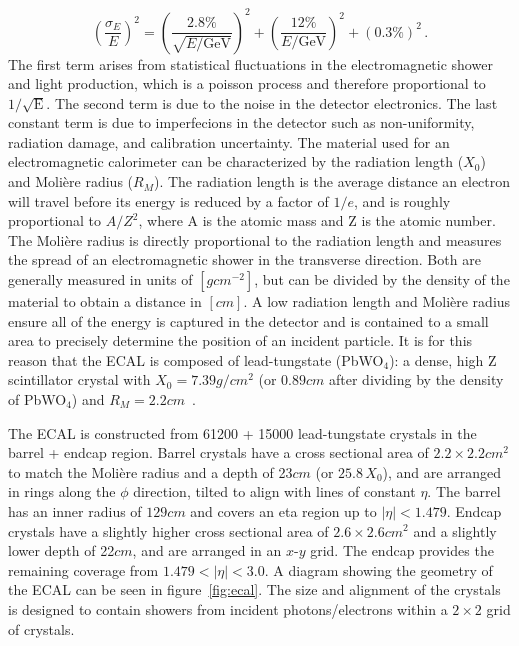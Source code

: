 \begin{equation}
	\left(\frac{\sigma_E}{E}\right)^2=\left(\frac{2.8\%}{\sqrt{E/\mathrm{GeV}}}\right)^2+\left(\frac{12\%}{E/\mathrm{GeV}}\right)^2+(0.3\%)^2\,.
\end{equation}
The first term arises from statistical fluctuations in the electromagnetic shower and light production, which is a poisson process and therefore proportional to $1/\sqrt{\mathrm{E}}$. The second term is due to the noise in the detector electronics. The last constant term is due to imperfecions in the detector such as non-uniformity, radiation damage, and calibration uncertainty.
The material used for an electromagnetic calorimeter can be characterized by the radiation length ($X_0$) and Moli\`ere radius ($R_M$). The radiation length is the average distance an electron will travel before its energy is reduced by a factor of $1/e$, and is roughly proportional to $A/Z^2$, where A is the atomic mass and Z is the atomic number. The Moli\`ere radius is directly proportional to the radiation length and measures the spread of an electromagnetic shower in the transverse direction. Both are generally measured in units of $\left[\si{g}\unit{cm^{-2}}\right]$, but can be divided by the density of the material to obtain a distance in $\left[\si{cm}\right]$. A low radiation length and Moli\`ere radius ensure all of the energy is captured in the detector and is contained to a small area to precisely determine the position of an incident particle. It is for this reason that the ECAL is composed of lead-tungstate (PbWO$_4$): a dense, high Z scintillator crystal with $X_0=7.39\unit{g/cm^2}$ (or $0.89\unit{cm}$ after dividing by the density of PbWO$_4$) and $R_M=2.2\unit{cm}$~\cite{Workman:2022ynf}.

The ECAL is constructed from 61200 + 15000 lead-tungstate crystals in the barrel + endcap region. Barrel crystals have a cross sectional area of $2.2\times2.2\unit{cm^2}$ to match the Moli\`ere radius and a depth of 23$\unit{cm}$ (or $25.8\,X_0$), and are arranged in rings along the $\phi$ direction, tilted to align with lines of constant $\eta$. The barrel has an inner radius of $129\unit{cm}$ and covers an eta region up to $\left|\eta\right|<1.479$. Endcap crystals have a slightly higher cross sectional area of $2.6\times2.6\unit{cm^2}$ and a slightly lower depth of 22$\unit{cm}$, and are arranged in an $x$-$y$ grid. The endcap provides the remaining coverage from $1.479<\left|\eta\right|<3.0$. A diagram showing the geometry of the ECAL can be seen in figure~\ref{fig:ecal}. The size and alignment of the crystals is designed to contain showers from incident photons/electrons within a $2\times2$ grid of crystals.

